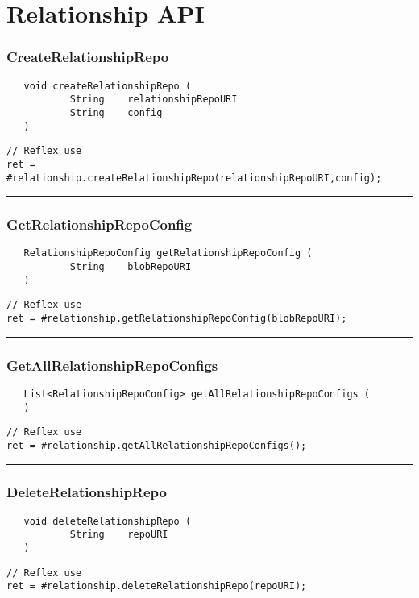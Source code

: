 \section{Relationship API}

\subsubsection{CreateRelationshipRepo}
\label{Api:CreateRelationshipRepo}
\begin{verbatim}
   void createRelationshipRepo (
           String    relationshipRepoURI
           String    config
   )
\end{verbatim}
\begin{lstlisting}[language=reflex]
// Reflex use
ret = #relationship.createRelationshipRepo(relationshipRepoURI,config);
\end{lstlisting}



\rule{15cm}{2pt}
\subsubsection{GetRelationshipRepoConfig}
\label{Api:GetRelationshipRepoConfig}
\begin{verbatim}
   RelationshipRepoConfig getRelationshipRepoConfig (
           String    blobRepoURI
   )
\end{verbatim}
\begin{lstlisting}[language=reflex]
// Reflex use
ret = #relationship.getRelationshipRepoConfig(blobRepoURI);
\end{lstlisting}



\rule{15cm}{2pt}
\subsubsection{GetAllRelationshipRepoConfigs}
\label{Api:GetAllRelationshipRepoConfigs}
\begin{verbatim}
   List<RelationshipRepoConfig> getAllRelationshipRepoConfigs (
   )
\end{verbatim}
\begin{lstlisting}[language=reflex]
// Reflex use
ret = #relationship.getAllRelationshipRepoConfigs();
\end{lstlisting}



\rule{15cm}{2pt}
\subsubsection{DeleteRelationshipRepo}
\label{Api:DeleteRelationshipRepo}
\begin{verbatim}
   void deleteRelationshipRepo (
           String    repoURI
   )
\end{verbatim}
\begin{lstlisting}[language=reflex]
// Reflex use
ret = #relationship.deleteRelationshipRepo(repoURI);
\end{lstlisting}



